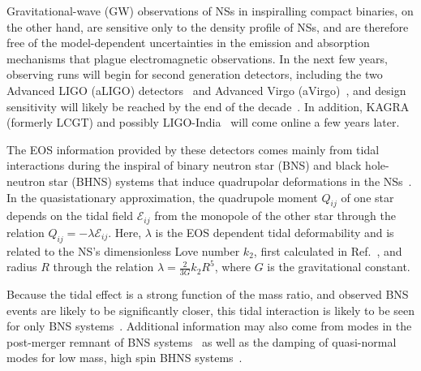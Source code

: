 \documentclass[twocolumn,prd,amssymb,aps,nofootinbib,showpacs,epsf]{revtex4}
\begin{document}
Gravitational-wave (GW) observations of NSs in inspiralling compact binaries, on the other hand, are sensitive only to the density profile of NSs, and are therefore free of the model-dependent uncertainties in the emission and absorption mechanisms that plague electromagnetic observations. In the next few years, observing runs will begin for second generation detectors, including the two Advanced LIGO (aLIGO) detectors~\cite{Harry2010} and Advanced Virgo (aVirgo)~\cite{Acernese2009}, and design sensitivity will likely be reached by the end of the decade~\cite{AasiAbadieAbbott2013}. In addition, \mbox{KAGRA}~\cite{Somiya2012} (formerly LCGT) and possibly LIGO-India~\cite{IyerSouradeepUnnikrishnan2011} will come online a few years later. 

The EOS information provided by these detectors comes mainly from tidal interactions during the inspiral of binary neutron star (BNS) and black hole-neutron star (BHNS) systems that induce quadrupolar deformations in the NSs~\cite{FlanaganHinderer2008}. In the quasistationary approximation, the quadrupole moment $Q_{ij}$ of one star depends on the tidal field $\mathcal{E}_{ij}$ from the monopole of the other star through the relation $Q_{ij} = -\lambda \mathcal{E}_{ij}$. Here, $\lambda$ is the EOS dependent tidal deformability and is related to the NS's dimensionless Love number $k_2$, first calculated in Ref.~\cite{Hinderer2008}, and radius $R$ through the relation $\lambda = \frac{2}{3G} k_2 R^5$, where $G$ is the gravitational constant.

Because the tidal effect is a strong function of the mass ratio, and observed BNS events are likely to be significantly closer, this tidal interaction is likely to be seen for only BNS systems~\cite{PannaraleRezzollaOhmeRead2011}. Additional information may also come from modes in the post-merger remnant of BNS systems~\cite{StergioulasBausweinZagkouris2011, ClarkBausweinCadonati2014} as well as the damping of quasi-normal modes for low mass, high spin BHNS systems~\cite{LackeyKyutokuShibata2014}. 
\end{document}
